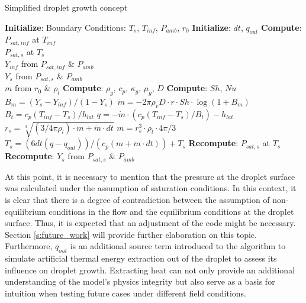 \documentclass[12pt]{article}
\begin{document}
\begin{algorithm}
    \caption{Simplified droplet growth concept}
    \label{alg:droplet}
    \begin{algorithmic}[1]
    \State \textbf{Initialize}: Boundary Conditions: $T_{s}$, $T_{inf}$, $P_{amb}$, $r_{0}$ 
    \State \textbf{Initialize}: $dt$, $q_{out}$ 
    \State \textbf{Compute}: $P_{sat,inf}$ at $T_{inf}$\\ 
    \quad \quad \quad \quad \quad $P_{sat,s}$ at $T_{s}$ \\
    \quad \quad \quad \quad \quad$Y_{inf}$ from $P_{sat,inf}$ \& $P_{amb}$ \\
    \quad \quad \quad \quad \quad$Y_{s}$ from $P_{sat,s}$ \& $P_{amb}$\\
    \quad \quad \quad \quad \quad$m$ from $r_{0}$ \& $\rho_{l}$ 
    \State \textbf{Compute}: $\rho_{g}$, $c_{p}$, $\kappa_{g}$, $\mu_{g}$, $D$ 
    \State \textbf{Compute}: $Sh$, $Nu$ 
    \State $B_{m}=(Y_{s}-Y_{inf})/(1-Y_{s})$
    \State $\dot{m}=-2\pi\rho_{v}D\cdot r \cdot Sh\cdot \log(1+B_{m})$
    \State $B_{t}=c_{p}(T_{inf}-T_{s})/h_{lat}$ 
    \State $q=-\dot{m}\cdot (c_{p}(T_{inf}-T_{s})/B_{t})-h_{lat}$
    \State $r_{s}=\sqrt[3]{(3/4\pi \rho_{l})\cdot m+\dot{m}\cdot dt}$
    \State $m=r_{s}^{3}\cdot \rho_{l}\cdot 4\pi/3$
    \State $T_{s}=(6 dt(q-q_{out}))/(c_{p}(m+\dot{m}\cdot dt))+T_{s}$
    \State \textbf{Recompute}: $P_{sat,s}$ at $T_{s}$
    \State \textbf{Recompute}: $Y_{s}$ from $P_{sat,s}$ \& $P_{amb}$
    \EndFor
    
    \end{algorithmic}
\end{algorithm}

 At this point, it is necessary to mention that the pressure at the droplet surface was calculated under the assumption of saturation conditions. In this context, it is clear that there is a degree of contradiction between the assumption of non-equilibrium conditions in the flow and the equilibrium conditions at the droplet surface. Thus, it is expected that an adjustment of the code might be necessary. Section \ref{s:future_work} will provide further elaboration on this topic. Furthermore, $q_{out}$ is an additional source term introduced to the algorithm to simulate artificial thermal energy extraction out of the droplet to assess its influence on droplet growth. Extracting heat can not only provide an additional understanding of the model's physics integrity but also serve as a basis for intuition when testing future cases under different field conditions.
\end{document}

